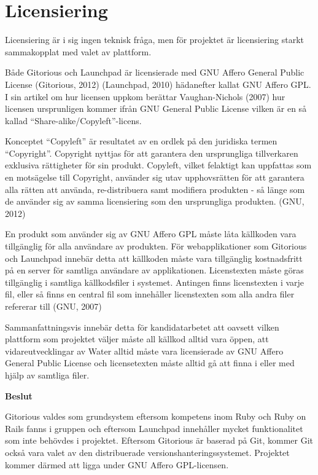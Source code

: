 \section{Licensiering}
Licensiering är i sig ingen teknisk fråga, men för projektet är licensiering starkt sammakopplat med valet av plattform. 

Både Gitorious och Launchpad är licensierade med GNU Affero General Public License (Gitorious, 2012) (Launchpad, 2010) hädanefter kallat GNU Affero GPL. I sin artikel om hur licensen uppkom berättar Vaughan-Nichols (2007) hur licensen ursprunligen kommer ifrån GNU General Public License vilken är en så kallad “Share-alike/Copyleft”-licens.

Konceptet “Copyleft” är resultatet av en  ordlek på den juridiska termen “Copyright”. Copyright nyttjas för att garantera den ursprungliga tillverkaren exklusiva rättigheter för sin produkt. Copyleft, vilket felaktigt kan uppfattas som en motsägelse till Copyright, använder sig utav upphovsrätten för att garantera alla rätten att använda, re-distribuera samt modifiera produkten - så länge som de använder sig av samma licensiering som den ursprungliga produkten. (GNU, 2012)

En produkt som använder sig av GNU Affero GPL måste låta källkoden vara tillgänglig för alla användare av produkten. För webapplikationer som Gitorious och Launchpad innebär detta att källkoden måste vara tillgänglig kostnadsfritt på en server för samtliga användare av applikationen. 
Licenstexten måste göras tillgänglig i samtliga källkodsfiler i systemet. Antingen finns licenstexten i varje fil, eller så finns en central fil som innehåller licenstexten som alla andra filer refererar till (GNU, 2007) 

Sammanfattningsvis innebär detta för kandidatarbetet att oavsett vilken plattform som projektet väljer måste all källkod alltid vara öppen, att vidareutvecklingar av Water alltid måste vara licensierade av GNU Affero General Public License och licensetexten måste alltid gå att finna i eller med hjälp av samtliga filer.

\begin{flushright}
  
  \textbf{Beslut}
  
  Gitorious valdes som grundsystem eftersom kompetens inom Ruby och Ruby on Rails fanns i gruppen och eftersom Launchpad innehåller mycket funktionalitet som inte behövdes i projektet. Eftersom Gitorious är baserad på Git, kommer Git också vara valet av den distribuerade versionshanteringssystemet. Projektet kommer därmed att ligga under GNU Affero GPL-licensen.  
  
\end{flushright}

